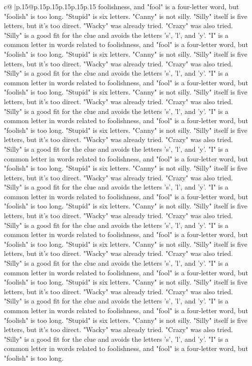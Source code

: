 \documentclass{article}
\begin{document}
{\begin{supertabular}{c@{$\;$}|p{.15\linewidth}@{}p{.15\linewidth}p{.15\linewidth}p{.15\linewidth}p{.15\linewidth}p{.15\linewidth}}
{{{foolishness, and "fool" is a four{-}letter word, but "foolish" is too long. "Stupid" is six letters. "Canny" is not silly. "Silly" itself is five letters, but it's too direct. "Wacky" was already tried. "Crazy" was also tried. "Silly" is a good fit for the clue and avoids the letters 's', 'l', and 'y'. "I" is a common letter in words related to foolishness, and "fool" is a four{-}letter word, but "foolish" is too long. "Stupid" is six letters. "Canny" is not silly. "Silly" itself is five letters, but it's too direct. "Wacky" was already tried. "Crazy" was also tried. "Silly" is a good fit for the clue and avoids the letters 's', 'l', and 'y'. "I" is a common letter in words related to foolishness, and "fool" is a four{-}letter word, but "foolish" is too long. "Stupid" is six letters. "Canny" is not silly. "Silly" itself is five letters, but it's too direct. "Wacky" was already tried. "Crazy" was also tried. "Silly" is a good fit for the clue and avoids the letters 's', 'l', and 'y'. "I" is a common letter in words related to foolishness, and "fool" is a four{-}letter word, but "foolish" is too long. "Stupid" is six letters. "Canny" is not silly. "Silly" itself is five letters, but it's too direct. "Wacky" was already tried. "Crazy" was also tried. "Silly" is a good fit for the clue and avoids the letters 's', 'l', and 'y'. "I" is a common letter in words related to foolishness, and "fool" is a four{-}letter word, but "foolish" is too long. "Stupid" is six letters. "Canny" is not silly. "Silly" itself is five letters, but it's too direct. "Wacky" was already tried. "Crazy" was also tried. "Silly" is a good fit for the clue and avoids the letters 's', 'l', and 'y'. "I" is a common letter in words related to foolishness, and "fool" is a four{-}letter word, but "foolish" is too long. "Stupid" is six letters. "Canny" is not silly. "Silly" itself is five letters, but it's too direct. "Wacky" was already tried. "Crazy" was also tried. "Silly" is a good fit for the clue and avoids the letters 's', 'l', and 'y'. "I" is a common letter in words related to foolishness, and "fool" is a four{-}letter word, but "foolish" is too long. "Stupid" is six letters. "Canny" is not silly. "Silly" itself is five letters, but it's too direct. "Wacky" was already tried. "Crazy" was also tried. "Silly" is a good fit for the clue and avoids the letters 's', 'l', and 'y'. "I" is a common letter in words related to foolishness, and "fool" is a four{-}letter word, but "foolish" is too long. "Stupid" is six letters. "Canny" is not silly. "Silly" itself is five letters, but it's too direct. "Wacky" was already tried. "Crazy" was also tried. "Silly" is a good fit for the clue and avoids the letters 's', 'l', and 'y'. "I" is a common letter in words related to foolishness, and "fool" is a four{-}letter word, but "foolish" is too long. "Stupid" is six letters. "Canny" is not silly. "Silly" itself is five letters, but it's too direct. "Wacky" was already tried. "Crazy" was also tried. "Silly" is a good fit for the clue and avoids the letters 's', 'l', and 'y'. "I" is a common letter in words related to foolishness, and "fool" is a four{-}letter word, but "foolish" is too long. }}}
\end{supertabular}}
\end{document}
